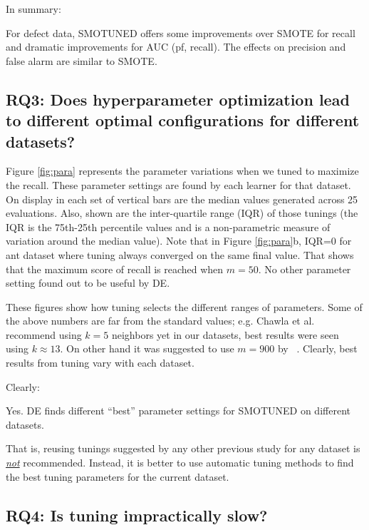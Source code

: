 \documentclass[10pt,conference]{IEEEtran}
\theoremstyle{break}
\theoremstyle{break}
\begin{document}
In summary:

\begin{lesson1}
    For defect data, SMOTUNED  
 offers   some  improvements over SMOTE for recall
 and dramatic improvements for AUC (pf, recall).
 The effects on precision and false alarm are similar to SMOTE.
\end{lesson1}


\subsection{\textbf{RQ3: Does hyperparameter optimization lead to different optimal configurations for different datasets?}}

Figure \ref{fig:para} represents the parameter variations when we tuned to maximize the recall. These parameter settings are found by each learner for that dataset.
On display in each set of vertical bars are
the median values generated across 25 evaluations.
Also, shown are
the inter-quartile range (IQR) of those tunings (the IQR is the 75th-25th percentile values and is a non-parametric measure of variation
around the median value). Note that in Figure \ref{fig:para}b, IQR=0 for  ant dataset where tuning always converged on the same final value. That shows that the maximum score of recall is reached when $m=50$. No other parameter setting found out to be useful by DE.

  These figures
show how tuning selects the different ranges  of
parameters.
Some of the above numbers are far from the standard values; e.g. Chawla et al.~\cite{chawla2002smote} recommend using $k=5$ neighbors yet in our datasets, best results were seen using $k \approx 13$. On other hand it was suggested to use $m=900$ by ~\cite{pears2014synthetic}.
Clearly,
best results from tuning
vary with each dataset.

Clearly:
\begin{lesson1}
    Yes. DE finds different ``best'' parameter settings for SMOTUNED on different datasets.
\end{lesson1}
 That is,  reusing tunings  suggested  by  any other  previous study  for any dataset is \underline{{\em not}} recommended. Instead,  it is better to
      use  automatic  tuning  methods  to find the best tuning parameters for the current dataset.
      

\subsection{\textbf{RQ4: Is tuning impractically slow?}}
\end{document}
